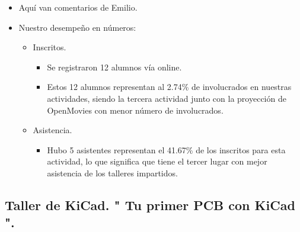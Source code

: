 \documentclass[a4paper,11pt]{article}                 %
\begin{document}
    \begin{itemize}
    \item Aquí van comentarios de Emilio.
    
    \item Nuestro desempeño en números:
    
    \begin{itemize}

    
    \item Inscritos.
    \begin{itemize}
      \item Se registraron 12 alumnos vía online.
      \item Estos 12 alumnos representan al 2.74\% de involucrados en nuestras actividades, siendo la tercera actividad junto con la proyección de OpenMovies con menor número de involucrados. 
    \end{itemize}
    
    \item Asistencia.
    \begin{itemize}
      \item Hubo 5 asistentes representan el 41.67\% de los inscritos para esta actividad, lo que significa que tiene el tercer lugar con mejor asistencia de los talleres impartidos. 
    \end{itemize}
    \end{itemize} 
    
  \end{itemize}  
  \subsection{Taller de KiCad. " Tu primer PCB con KiCad ".}  
  
\end{document}

